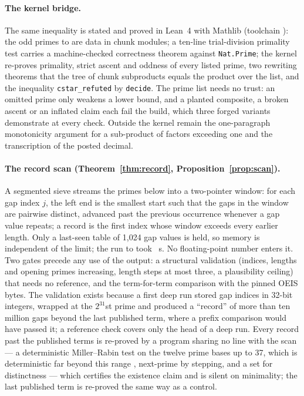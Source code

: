 \documentclass[11pt]{article}
\theoremstyle{definition}\newtheorem{observation}{Observation}
\begin{document}
\paragraph{The kernel bridge.} The same inequality is stated and proved in Lean~4 \cite{Lean4} with Mathlib \cite{Mathlib} (toolchain \texttt{\LeanToolchain}): the odd primes to \RefLimit{} are data in \LeanChunks{} chunk modules; a ten-line trial-division primality test carries a machine-checked correctness theorem against \texttt{Nat.Prime}; the kernel re-proves primality, strict ascent and oddness of every listed prime, two rewriting theorems that the tree of chunk subproducts equals the product over the list, and the inequality \texttt{cstar\_refuted} by \texttt{decide}. The prime list needs no trust: an omitted prime only weakens a lower bound, and a planted composite, a broken ascent or an inflated claim each fail the build, which three forged variants demonstrate at every check. Outside the kernel remain the one-paragraph monotonicity argument for a sub-product of factors exceeding one and the transcription of the posted decimal.

\paragraph{The record scan (Theorem~\ref{thm:record}, Proposition~\ref{prop:scan}).} A segmented sieve streams the primes below \HLimit{} into a two-pointer window: for each gap index $j$, the left end is the smallest start such that the gaps in the window are pairwise distinct, advanced past the previous occurrence whenever a gap value repeats; a record is the first index whose window exceeds every earlier length. Only a last-seen table of 1,024 gap values is held, so memory is independent of the limit; the run to \HLimit{} took \HSeconds{}~s. No floating-point number enters it. Two gates precede any use of the output: a structural validation (indices, lengths and opening primes increasing, length steps at most three, a plausibility ceiling) that needs no reference, and the term-for-term comparison with the pinned OEIS bytes. The validation exists because a first deep run stored gap indices in 32-bit integers, wrapped at the $2^{31}$st prime and produced a ``record'' of more than ten million gaps beyond the last published term, where a prefix comparison would have passed it; a reference check covers only the head of a deep run. Every record past the published terms is re-proved by a program sharing no line with the scan --- a deterministic Miller--Rabin test on the twelve prime bases up to 37, which is deterministic far beyond this range \cite{Jaeschke93}, next-prime by stepping, and a set for distinctness --- which certifies the existence claim and is silent on minimality; the last published term is re-proved the same way as a control.
\end{document}
